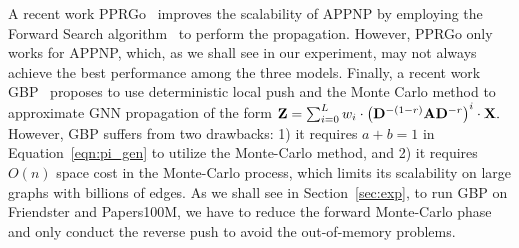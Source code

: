 A recent work PPRGo~\cite{bojchevski2020scaling} improves the scalability of APPNP by employing the Forward Search algorithm~\cite{FOCS06_FS} to perform the propagation. However, PPRGo only works for APPNP, which, as we shall see in our experiment, may not always achieve the best performance among the three models.  Finally,
a recent work GBP~\cite{chen2020GBP} proposes to use deterministic local push and the Monte Carlo method to approximate GNN propagation of the form $\mathbf{Z}=\sum_{i=0}^L w_i \cdot \left(\mathbf{D}^{-(1-r)}\mathbf{A} \mathbf{D}^{-r} \right)^i \cdot \mathbf{X}.$ However, GBP suffers from two drawbacks: 1) it requires $a+b = 1$ in Equation~\eqref{eqn:pi_gen} to utilize the Monte-Carlo method, and 
2) it requires $O(n)$ space cost in the Monte-Carlo process, which limits its scalability on large graphs with billions of edges. As we shall see in Section~\ref{sec:exp}, to run GBP on Friendster and Papers100M, we have to reduce the forward Monte-Carlo phase and only conduct the reverse push to avoid the out-of-memory problems. 













